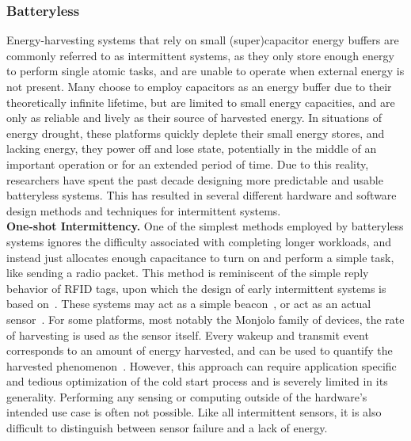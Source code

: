 \subsubsection{Batteryless}
\label{sec:related:batteryless}

Energy-harvesting systems that rely
on small (super)capacitor energy buffers are commonly referred to as intermittent systems, as they only store enough energy to perform single atomic tasks, and are unable to operate when external energy is not present.
Many choose to employ
capacitors as an energy buffer due to their theoretically infinite lifetime,
but are limited to small energy capacities, and are only as reliable and
lively as their source of harvested energy.
In situations of energy drought, 
these platforms quickly deplete their 
small energy stores, and lacking energy,
they power off and lose
state, potentially in the middle of an important operation or for an extended period of time.
Due to this reality, researchers have spent the past decade
designing more predictable and usable batteryless systems. This has resulted in several different hardware and software design methods and techniques for intermittent systems.
\\

\noindent
\textbf{One-shot Intermittency.}
One of the simplest methods employed by batteryless systems ignores the difficulty associated with completing longer workloads, and instead just allocates enough capacitance to turn on and perform a simple task, like sending a radio packet. This method is reminiscent of the simple reply behavior of RFID tags, upon which the design of early intermittent systems is based on~\cite{sample2008design}. These systems may act as a simple beacon~\cite{campbell2016cinamin,saoda2019no}, or act as an actual sensor~\cite{debruin2013monjolo, campbellEnergy14, campbellThermes14}.
For some platforms, most notably the Monjolo family of devices, the rate of harvesting is used as the sensor itself. Every wakeup and transmit event corresponds to an amount of energy harvested, and can be used to quantify the harvested phenomenon~\cite{campbellThermes14, campbellEnergy14, debruin2013monjolo}.
However, this approach can require application specific
and tedious optimization of the cold start process and is severely
limited in its generality. Performing any sensing or computing outside of the
hardware's intended use case is often not possible.
Like all intermittent sensors, it is also difficult to distinguish between sensor failure and a lack of energy.
\\

